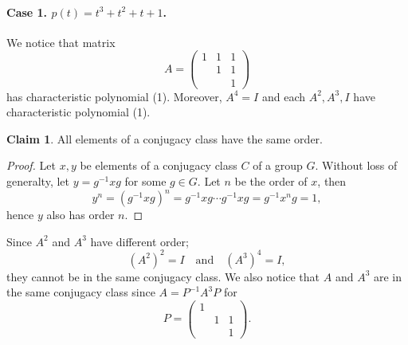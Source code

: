 \documentclass{article}
\theoremstyle{definition}
\newtheorem*{claim}{Claim}
\begin{document}
\paragraph{Case 1. $p(t) = t^3 + t^2 + t + 1$.}

We notice that matrix
\[
    A =
    \begin{pmatrix}
        1 & 1 & 1 \\
          & 1 & 1 \\
          &   & 1
    \end{pmatrix}
\]
has characteristic polynomial (1).
Moreover, $A^4 = I$ and each $A^2, A^3, I$ have characteristic polynomial (1).

\begin{claim}
All elements of a conjugacy class have the same order.
\end{claim}

\begin{proof}
Let $x, y$ be elements of a conjugacy class $C$ of a group $G$.
Without loss of generalty, let $y = g^{-1} x g$ for some $g \in G$.
Let $n$ be the order of $x$, then
\[ y^n = (g^{-1} x g)^n = g^{-1} x g \cdots g^{-1} x g = g^{-1} x^n g = 1, \]
hence $y$ also has order $n$.
\end{proof}

Since $A^2$ and $A^3$ have different order;
\[ (A^2)^2 = I \quad \text{and} \quad (A^3)^4 = I, \]
they cannot be in the same conjugacy class.
We also notice that $A$ and $A^3$ are in the same conjugacy class since $A = P^{-1} A^3 P$ for
\[
    P =
    \begin{pmatrix}
        1 &   &   \\
          & 1 & 1 \\
          &   & 1
    \end{pmatrix}.
\]
\end{document}
